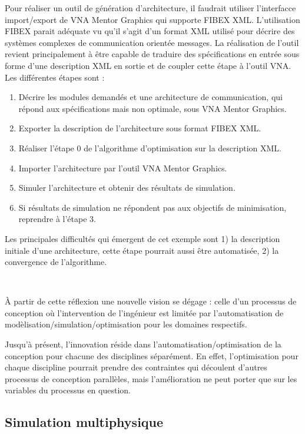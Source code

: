 \documentclass[11pt]{article}
\begin{document}
Pour réaliser un outil de génération d’architecture, il faudrait utiliser 
l’interfacce import/export de VNA Mentor Graphics qui supporte FIBEX XML.
L’utilisation FIBEX parait adéquate vu qu’il s’agit d’un format XML
utilisé pour décrire des systèmes complexes de communication orientée messages.
La réalisation de l’outil revient principalement à être capable de traduire des
spécifications en entrée sous forme d’une description XML en sortie et de 
coupler cette étape à l’outil VNA. Les différentes étapes sont :
\begin{enumerate}
\item Décrire les modules demandés et une architecture de communication, qui
répond aux spécifications mais non optimale, sous VNA Mentor Graphics.
\item Exporter la description de l’architecture sous format FIBEX XML.
\item Réaliser l’étape 0 de l’algorithme d’optimisation sur la description XML.
\item Importer l’architecture par l’outil VNA Mentor Graphics.
\item Simuler l’architecture et obtenir des résultats de simulation.
\item Si résultats de simulation ne répondent pas aux objectifs de minimisation,
reprendre à l’étape 3.
\end{enumerate}

Les principales difficultés qui émergent de cet exemple sont 1) la description
initiale d'une architecture, cette étape pourrait aussi être automatisée, 2) la
convergence de l'algorithme.

~

\`A partir de cette réflexion une nouvelle vision se dégage : celle d'un
processus de conception où l'intervention de l'ingénieur est limitée par
l'automatisation de modèlisation/simulation/optimisation pour les domaines
respectifs.

Jusqu'à présent, l'innovation réside dans l'automatisation/optimisation de la
conception pour chacune des disciplines séparément. En effet, l'optimisation
pour chaque discipline pourrait prendre des contraintes qui découlent d'autres
processus de conception parallèles, mais l'amélioration ne peut porter que sur
les variables du processus en question.

\subsection{Simulation multiphysique}
\end{document}
